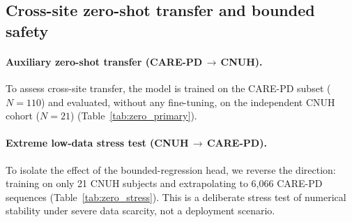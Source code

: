\documentclass[preprint,12pt]{elsarticle}
\begin{document}
\subsection{Cross-site zero-shot transfer and bounded safety}
\label{sec:crossds}

\paragraph{Auxiliary zero-shot transfer (CARE-PD\,$\to$\,CNUH).}
To assess cross-site transfer, the model is trained on the CARE-PD subset
($N=110$) and evaluated, without any fine-tuning, on the independent CNUH cohort
($N=21$) (Table~\ref{tab:zero_primary}).

\begin{table}[htpb]
\centering
\caption{Auxiliary zero-shot transfer (CARE-PD\,$\to$\,CNUH). No fine-tuning or
domain adaptation was applied.}
\label{tab:zero_primary}
\end{table}

\paragraph{Extreme low-data stress test (CNUH\,$\to$\,CARE-PD).}
To isolate the effect of the bounded-regression head, we reverse the direction:
training on only 21 CNUH subjects and extrapolating to 6{,}066 CARE-PD sequences
(Table~\ref{tab:zero_stress}). This is a deliberate stress test of numerical
stability under severe data scarcity, not a deployment scenario.

\begin{table}[htpb]
\centering
\caption{Extreme low-data stress test (CNUH\,$\to$\,CARE-PD), isolating the
bounded-output safety mechanism.}
\label{tab:zero_stress}
\end{table}
\end{document}

